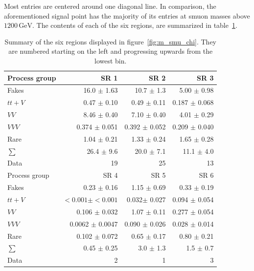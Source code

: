 \noindent Most entries are centered around one diagonal line. In comparison, the aforementioned signal point has the majority of its entries at smuon masses above $1200\,\text{GeV}$. The contents of each of the six regions, are summarized in table~\ref{tab:m_smu_chi_summary}.

\begin{table}[!htbp]
  \centering
  \begin{tabular}{|l|r|r|r|}
    \hline
    Process group & SR 1              & SR 2              & SR 3              \\ \hline
    Fakes         & 16.0 $\pm$ 1.63   & 10.7 $\pm$ 1.3    & 5.00 $\pm$ 0.98   \\ 
    $tt+V$        & 0.47 $\pm$ 0.10   & 0.49 $\pm$ 0.11   & 0.187 $\pm$ 0.068 \\ 
    $VV$          & 8.46 $\pm$ 0.40   & 7.10 $\pm$ 0.40   & 4.01 $\pm$ 0.29   \\
    $VVV$         & 0.374 $\pm$ 0.051 & 0.392 $\pm$ 0.052 & 0.209 $\pm$ 0.040 \\ 
    Rare          & 1.04 $\pm$ 0.21   & 1.33 $\pm$ 0.24   & 1.65 $\pm$ 0.28   \\ \hline
    $\sum$        & 26.4 $\pm$ 9.6    & 20.0 $\pm$ 7.1      & 11.1 $\pm$ 4.0    \\ \hline
    Data          & 19                & 25                & 13                \\ \hline \hline
    Process group & SR 4                & SR 5              & SR 6              \\ \hline
    Fakes         & 0.23 $\pm$ 0.16     & 1.15 $\pm$ 0.69   & 0.33 $\pm$ 0.19   \\
    $tt+V$        & $<0.001 \pm <0.001$ & 0.032$\pm$ 0.027  & 0.094 $\pm$ 0.054 \\
    $VV$          & 0.106 $\pm$ 0.032   & 1.07 $\pm$ 0.11   & 0.277 $\pm$ 0.054 \\
    $VVV$         & 0.0062 $\pm$ 0.0047 & 0.090 $\pm$ 0.026 & 0.028 $\pm$ 0.014 \\
    Rare          & 0.102 $\pm$ 0.072   & 0.65 $\pm$ 0.17   & 0.80 $\pm$ 0.21   \\ \hline
    $\sum$        & 0.45 $\pm$ 0.25     & 3.0 $\pm$ 1.3     & 1.5 $\pm$ 0.7     \\ \hline
    Data          & 2                   & 1                 & 3                 \\ \hline
  \end{tabular}
  \caption{Summary of the six regions displayed in figure~\ref{fig:m_smu_chi}. They are numbered starting on the left and progressing upwards from the lowest bin.}
  \label{tab:m_smu_chi_summary}
\end{table}


